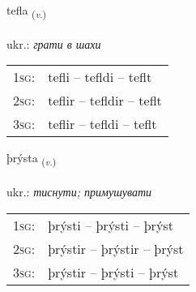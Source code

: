 \documentclass[frontgrid, backgrid]{flacards}\usepackage[]{graphicx}\usepackage[]{xcolor}
\begin{document}
\renewcommand{\flhead}{\vskip5pt \fboxsep=0pt {\small\bfseries\footnotesize Sagnorð | дієслово}}
\renewcommand{\fcfoot}{\vskip5pt \fboxsep=0pt \hspace{2pt}{\small\bfseries\footnotesize 3K}}

\renewcommand{\blhead}{\vskip5pt {\small\bfseries\footnotesize Sagnorð | дієслово }}
\renewcommand{\bcfoot}{\vskip5pt \hspace{2pt}{\small\bfseries\footnotesize 3K}}


{tefla \small{\textsubscript{(\textit{v.})}} \\[1ex] %
\textphonetic{[tʰɛpla]} \\
ukr.: \emph{грати в шахи} \\  [2ex]
\renewcommand*{\arraystretch}{0.8}
\begin{tabular}{p{1cm}l}
\textsc{1sg}: & tefli -- tefldi -- teflt \\ 
\textsc{2sg}: & teflir -- tefldir -- teflt \\ 
\textsc{3sg}: & teflir -- tefldi -- teflt \\ 
\end{tabular}
}

\renewcommand{\flhead}{\vskip5pt \fboxsep=0pt {\small\bfseries\footnotesize Sagnorð | дієслово}}
\renewcommand{\fcfoot}{\vskip5pt \fboxsep=0pt \hspace{2pt}{\small\bfseries\footnotesize 3K}}

\renewcommand{\blhead}{\vskip5pt {\small\bfseries\footnotesize Sagnorð | дієслово }}
\renewcommand{\bcfoot}{\vskip5pt \hspace{2pt}{\small\bfseries\footnotesize 3K}}


{þrýsta \small{\textsubscript{(\textit{v.})}} \\[1ex] %
\textphonetic{[θrista]} \\
ukr.: \emph{тиснути; примушувати} \\  [2ex]
\renewcommand*{\arraystretch}{0.8}
\begin{tabular}{p{1cm}l}
\textsc{1sg}: & þrýsti -- þrýsti -- þrýst \\ 
\textsc{2sg}: & þrýstir -- þrýstir -- þrýst \\ 
\textsc{3sg}: & þrýstir -- þrýsti -- þrýst \\ 
\end{tabular}
}
\end{document}
